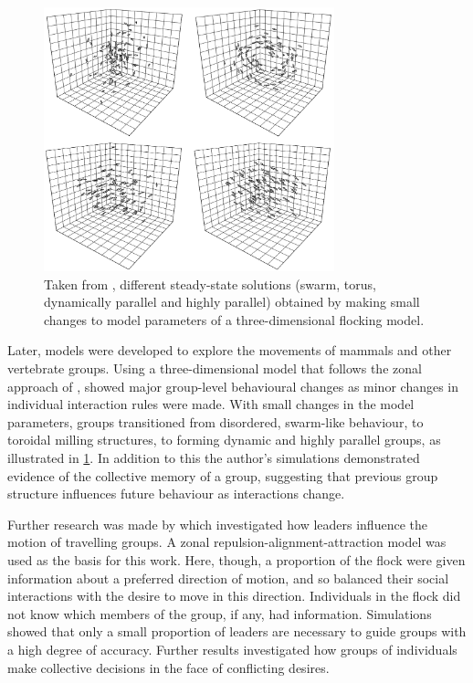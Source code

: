 \begin{figure}[tb]
  \includegraphics[width=0.75\textwidth]{couzin.png}
  \caption{Taken from \textcite{couzin02}, different steady-state
    solutions (swarm, torus, dynamically parallel and highly parallel) obtained
    by making small changes to model parameters of a three-dimensional flocking
    model.}
  \label{fig:couzin}
\end{figure}

Later, models were developed to explore the movements of mammals and other
vertebrate groups. Using a three-dimensional model that follows the zonal
approach of \textcite{aoki82}, \textcite{couzin02} showed major group-level
behavioural changes as minor changes in individual interaction rules were made.
With small changes in the model parameters, groups transitioned from
disordered, swarm-like behaviour, to toroidal milling structures, to forming
dynamic and highly parallel groups, as illustrated in \cref{fig:couzin}. In
addition to this the author's simulations demonstrated evidence of the
collective memory of a group, suggesting that previous group structure
influences future behaviour as interactions change.

Further research was made by \textcite{couzin05} which investigated how leaders
influence the motion of travelling groups. A zonal
repulsion-alignment-attraction model was used as the basis for this work. Here,
though, a proportion of the flock were given information about a preferred
direction of motion, and so balanced their social interactions with the desire
to move in this direction. Individuals in the flock did not know which members
of the group, if any, had information. Simulations showed that only a small
proportion of leaders are necessary to guide groups with a high degree of
accuracy. Further results investigated how groups of individuals make
collective decisions in the face of conflicting desires.

